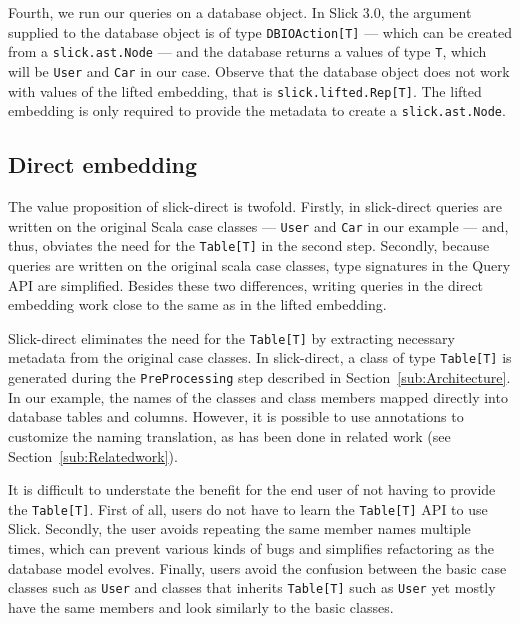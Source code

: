 Fourth, we run our queries on a database object.
In Slick 3.0, the argument supplied to the database object is of type \texttt{DBIOAction[T]} --- which can be created from a \texttt{slick.ast.Node} --- and the database returns a values of type \texttt{T}, which will be \texttt{User} and \texttt{Car} in our case.
Observe that the database object does not work with values of the lifted embedding, that is \texttt{slick.lifted.Rep[T]}.
The lifted embedding is only required to provide the metadata to create a \texttt{slick.ast.Node}.

\subsection{Direct embedding} %
\label{sub:Directembedding}
The value proposition of slick-direct is twofold.
Firstly, in slick-direct queries are written on the original Scala case classes --- \texttt{User} and \texttt{Car} in our example --- and, thus, obviates the need for the \texttt{Table[T]} in the second step.
Secondly, because queries are written on the original scala case classes, type signatures in the Query API are simplified.
Besides these two differences, writing queries in the direct embedding work close to the same as in the lifted embedding.

Slick-direct eliminates the need for the \texttt{Table[T]} by extracting necessary metadata from the original case classes.
In slick-direct, a class of type \texttt{Table[T]} is generated during the \texttt{PreProcessing} step described in Section~\ref{sub:Architecture}.
In our example, the names of the classes and class members mapped directly into database tables and columns.
However, it is possible to use annotations to customize the naming translation, as has been done in related work (see Section~\ref{sub:Relatedwork}).

It is difficult to understate the benefit for the end user of not having to provide the \texttt{Table[T]}.
First of all, users do not have to learn the \texttt{Table[T]} API to use Slick.
Secondly, the user avoids repeating the same member names multiple times, which can prevent various kinds of bugs and simplifies refactoring as the database model evolves.
Finally, users avoid the confusion between the basic case classes such as \texttt{User} and classes that inherits \texttt{Table[T]} such as \texttt{User} yet mostly have the same members and look similarly to the basic classes.

